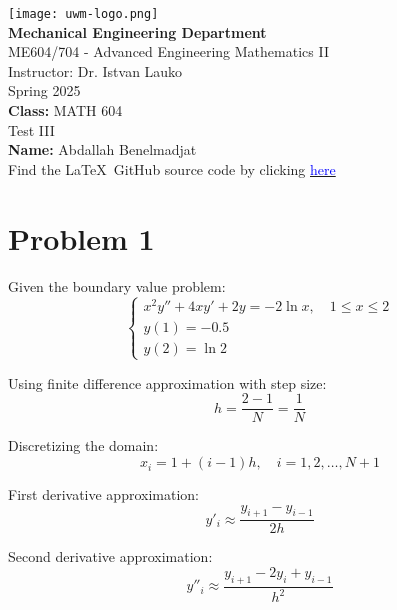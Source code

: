\documentclass{article}
\begin{document}
\date{}

\begin{titlepage}
    \centering
    \texttt{[image: uwm-logo.png]} \\[1cm]
    
    {\Large \textbf{Mechanical Engineering Department}}\\[0.5em]
    {\large ME604/704 - Advanced Engineering Mathematics II}\\[0.5em]
    {\large Instructor: Dr. Istvan Lauko}\\[0.5em]
    {\large Spring 2025}\\[2cm]
    
    {\large \textbf{Class:} MATH 604}\\[0.5em]
    {\large \textbf{} Test III}\\[0.5em]
    {\large \textbf{Name:} Abdallah Benelmadjat}\\[0.5em]
    {\large Find the \LaTeX\ GitHub source code by clicking \href{https://github.com/abdallah-benelmadjat/MATH-602/blob/main/HW4.tex}{\textcolor{blue}{here}}}\\
\end{titlepage}

\newpage


\section*{Problem 1}

Given the boundary value problem:
\[
\begin{cases}
x^2 y'' + 4x y' + 2y = -2 \ln x, \quad 1 \leq x \leq 2 \\
y(1) = -0.5 \\
y(2) = \ln 2
\end{cases}
\]

Using finite difference approximation with step size:
\[
h = \frac{2 - 1}{N} = \frac{1}{N}
\]

Discretizing the domain:
\[
x_i = 1 + (i-1)h, \quad i = 1, 2, \dots, N+1
\]

First derivative approximation:
\[
y'_i \approx \frac{y_{i+1} - y_{i-1}}{2h}
\]

Second derivative approximation:
\[
y''_i \approx \frac{y_{i+1} - 2y_i + y_{i-1}}{h^2}
\]
\end{document}

